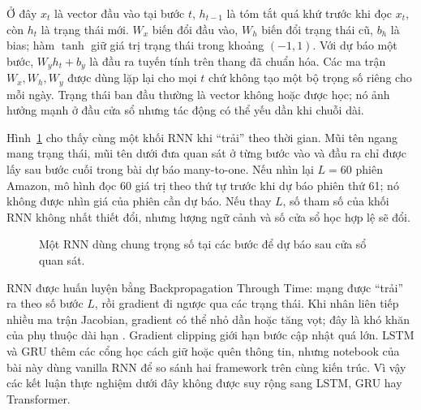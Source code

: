 \documentclass[12pt,a4paper]{report}
\begin{document}
Ở đây $x_t$ là vector đầu vào tại bước $t$, $h_{t-1}$ là tóm tắt quá khứ trước khi đọc $x_t$, còn $h_t$ là trạng thái mới. $W_x$ biến đổi đầu vào, $W_h$ biến đổi trạng thái cũ, $b_h$ là bias; hàm $\tanh$ giữ giá trị trạng thái trong khoảng $(-1,1)$. Với dự báo một bước, $W_yh_t+b_y$ là đầu ra tuyến tính trên thang đã chuẩn hóa. Các ma trận $W_x,W_h,W_y$ được dùng lặp lại cho mọi $t$ chứ không tạo một bộ trọng số riêng cho mỗi ngày. Trạng thái ban đầu thường là vector không hoặc được học; nó ảnh hưởng mạnh ở đầu cửa sổ nhưng tác động có thể yếu dần khi chuỗi dài.

Hình~\ref{fig:essay03-rnn-unrolled} cho thấy cùng một khối RNN khi ``trải'' theo thời gian. Mũi tên ngang mang trạng thái, mũi tên dưới đưa quan sát ở từng bước vào và đầu ra chỉ được lấy sau bước cuối trong bài dự báo many-to-one. Nếu nhìn lại $L=60$ phiên Amazon, mô hình đọc 60 giá trị theo thứ tự trước khi dự báo phiên thứ 61; nó không được nhìn giá của phiên cần dự báo. Nếu thay $L$, số tham số của khối RNN không nhất thiết đổi, nhưng lượng ngữ cảnh và số cửa sổ học hợp lệ sẽ đổi.
\begin{figure}[H]\centering
{}
\caption{Một RNN dùng chung trọng số tại các bước để dự báo sau cửa sổ quan sát.}\label{fig:essay03-rnn-unrolled}
\end{figure}

RNN được huấn luyện bằng Backpropagation Through Time: mạng được ``trải'' ra theo số bước $L$, rồi gradient đi ngược qua các trạng thái. Khi nhân liên tiếp nhiều ma trận Jacobian, gradient có thể nhỏ dần hoặc tăng vọt; đây là khó khăn của phụ thuộc dài hạn \cite{bengio1994}. Gradient clipping giới hạn bước cập nhật quá lớn. LSTM và GRU thêm các cổng học cách giữ hoặc quên thông tin, nhưng notebook của bài này dùng vanilla RNN để so sánh hai framework trên cùng kiến trúc. Vì vậy các kết luận thực nghiệm dưới đây không được suy rộng sang LSTM, GRU hay Transformer.
\end{document}

